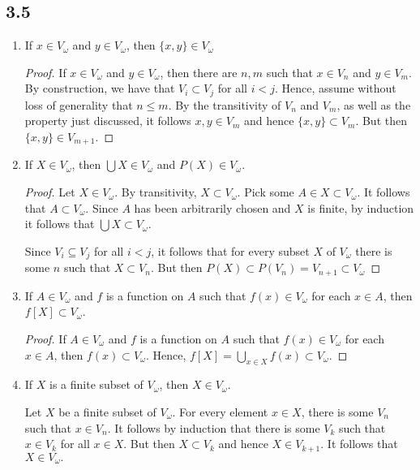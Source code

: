 \subsection*{3.5}
\begin{enumerate}
    \item If $x \in V_\omega$ and $y \in V_\omega$, then $\{x,y\} \in V_\omega$

    \begin{proof}
        If $x \in V_\omega$ and $y \in V_\omega$, then there are $n, m$ such that $x \in V_n$ and $y \in V_m$. By construction, we have that $V_i \subset V_j$ for all $i < j$. Hence, assume without loss of generality that $n \leq m$. By the transitivity of $V_n$ and $V_m$, as well as the property just discussed, it follows $x, y \in V_m$ and hence $\{x,y\} \subset V_m$. But then $\{x, y\} \in V_{m+1}$.
    \end{proof}

    \item If $X \in V_\omega$, then $\bigcup X \in V_\omega$ and $P(X) \in V_{\omega}$.
    \begin{proof}
        Let $X \in V_\omega$. By transitivity, $X \subset V_\omega$. Pick some $A \in X \subset V_\omega$. It follows that $A \subset V_\omega$. Since $A$ has been arbitrarily chosen and $X$ is finite, by induction it follows that $\bigcup X \subset V_\omega$.

        Since $V_i \subseteq V_j$ for all $i < j$, it follows that for every subset $X$ of $V_\omega$ there is some $n$ such that $X \subset V_n$. But then $P(X) \subset P(V_n) = V_{n+1} \subset V_\omega$
    \end{proof}

    \item If $A \in V_\omega$ and $f$ is a function on $A$ such that $f(x) \in V_\omega$ for each $x \in A$, then $f[X] \subset V_\omega$.

    \begin{proof}
        If $A \in V_\omega$ and $f$ is a function on $A$ such that $f(x) \in V_\omega$ for each $x \in A$, then $f(x) \subset V_\omega$. Hence, $f[X] = \bigcup_{x\in X} f(x) \subset V_\omega$.
    \end{proof}

    \item If $X$ is a finite subset of $V_\omega$, then $X \in V_\omega$.

    Let $X$ be a finite subset of $V_\omega$. For every element $x \in X$, there is some $V_n$ such that $x \in V_n$. It follows by induction that there is some $V_k$ such that $x \in V_k$ for all $x \in X$. But then $X \subset V_k$ and hence $X \in V_{k+1}$. It follows that $X \in V_\omega.$
\end{enumerate}


